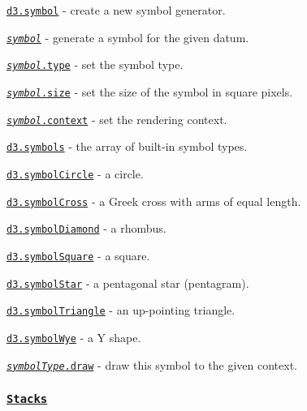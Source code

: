 \begin{DoxyItemize}
\item \href{https://github.com/d3/d3-shape/blob/master/README.md#symbol}{\tt d3.\+symbol} -\/ create a new symbol generator.
\item \href{https://github.com/d3/d3-shape/blob/master/README.md#_symbol}{\tt {\itshape symbol}} -\/ generate a symbol for the given datum.
\item \href{https://github.com/d3/d3-shape/blob/master/README.md#symbol_type}{\tt {\itshape symbol}.type} -\/ set the symbol type.
\item \href{https://github.com/d3/d3-shape/blob/master/README.md#symbol_size}{\tt {\itshape symbol}.size} -\/ set the size of the symbol in square pixels.
\item \href{https://github.com/d3/d3-shape/blob/master/README.md#symbol_context}{\tt {\itshape symbol}.context} -\/ set the rendering context.
\item \href{https://github.com/d3/d3-shape/blob/master/README.md#symbols}{\tt d3.\+symbols} -\/ the array of built-\/in symbol types.
\item \href{https://github.com/d3/d3-shape/blob/master/README.md#symbolCircle}{\tt d3.\+symbol\+Circle} -\/ a circle.
\item \href{https://github.com/d3/d3-shape/blob/master/README.md#symbolCross}{\tt d3.\+symbol\+Cross} -\/ a Greek cross with arms of equal length.
\item \href{https://github.com/d3/d3-shape/blob/master/README.md#symbolDiamond}{\tt d3.\+symbol\+Diamond} -\/ a rhombus.
\item \href{https://github.com/d3/d3-shape/blob/master/README.md#symbolSquare}{\tt d3.\+symbol\+Square} -\/ a square.
\item \href{https://github.com/d3/d3-shape/blob/master/README.md#symbolStar}{\tt d3.\+symbol\+Star} -\/ a pentagonal star (pentagram).
\item \href{https://github.com/d3/d3-shape/blob/master/README.md#symbolTriangle}{\tt d3.\+symbol\+Triangle} -\/ an up-\/pointing triangle.
\item \href{https://github.com/d3/d3-shape/blob/master/README.md#symbolWye}{\tt d3.\+symbol\+Wye} -\/ a Y shape.
\item \href{https://github.com/d3/d3-shape/blob/master/README.md#symbolType_draw}{\tt {\itshape symbol\+Type}.draw} -\/ draw this symbol to the given context.
\end{DoxyItemize}

\subsubsection*{\href{https://github.com/d3/d3-shape/blob/master/README.md#stacks}{\tt Stacks}}

